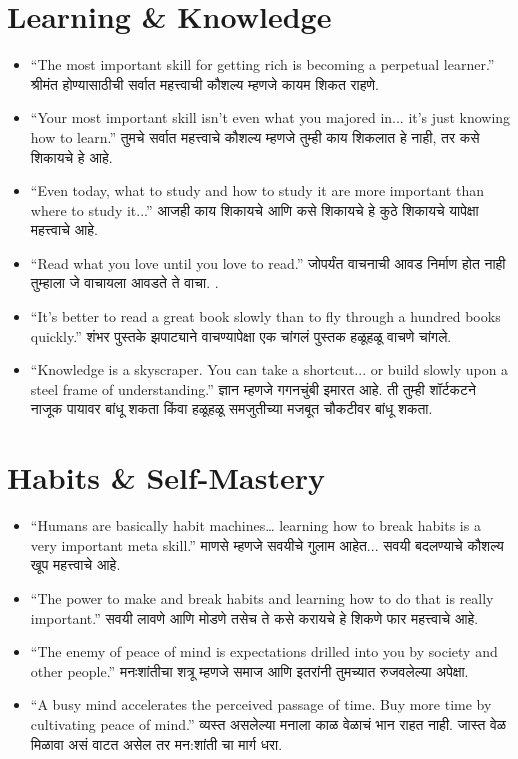 \section*{Learning \& Knowledge}
\begin{itemize}
    \item ``The most important skill for getting rich is becoming a perpetual learner.'' श्रीमंत होण्यासाठीची सर्वात महत्त्वाची कौशल्य म्हणजे कायम शिकत राहणे.

    \item ``Your most important skill isn’t even what you majored in... it’s just knowing how to learn.'' तुमचे सर्वात महत्त्वाचे कौशल्य म्हणजे तुम्ही काय शिकलात हे नाही, तर कसे शिकायचे हे आहे.

    \item ``Even today, what to study and how to study it are more important than where to study it...'' आजही काय शिकायचे आणि कसे शिकायचे हे कुठे शिकायचे यापेक्षा महत्त्वाचे आहे.

    \item ``Read what you love until you love to read.'' जोपर्यंत वाचनाची आवड निर्माण होत नाही तुम्हाला जे वाचायला आवडते ते वाचा. .

    \item ``It’s better to read a great book slowly than to fly through a hundred books quickly.'' शंभर पुस्तके झपाट्याने वाचण्यापेक्षा एक चांगलं पुस्तक हळूहळू वाचणे चांगले.

    \item ``Knowledge is a skyscraper. You can take a shortcut... or build slowly upon a steel frame of understanding.'' ज्ञान म्हणजे गगनचुंबी इमारत आहे. ती तुम्ही शॉर्टकटने नाजूक पायावर बांधू शकता किंवा हळूहळू समजुतीच्या मजबूत चौकटीवर बांधू शकता.
\end{itemize}

\section*{Habits \& Self-Mastery}
\begin{itemize}
    \item ``Humans are basically habit machines… learning how to break habits is a very important meta skill.'' माणसे म्हणजे सवयीचे गुलाम आहेत... सवयी बदलण्याचे कौशल्य खूप महत्त्वाचे आहे.

    \item ``The power to make and break habits and learning how to do that is really important.'' सवयी लावणे आणि मोडणे तसेच ते कसे करायचे हे शिकणे फार महत्त्वाचे आहे.

    \item ``The enemy of peace of mind is expectations drilled into you by society and other people.'' मनःशांतीचा शत्रू म्हणजे समाज आणि इतरांनी तुमच्यात रुजवलेल्या अपेक्षा.

    \item ``A busy mind accelerates the perceived passage of time. Buy more time by cultivating peace of mind.'' व्यस्त असलेल्या मनाला काळ वेळाचं भान राहत नाही. जास्त वेळ मिळावा असं वाटत असेल तर मन:शांती चा मार्ग धरा.
\end{itemize}

